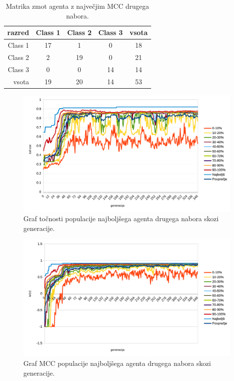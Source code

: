 \begin{table}[H]
    \centering
    \begin{tabular}{||rcccc||}
        \hline
        razred  & Class 1 & Class 2 & Class 3 & vsota \\ \hline
        Class 1 & 17      & 1       & 0       & 18    \\ \hline
        Class 2 & 2       & 19      & 0       & 21    \\ \hline
        Class 3 & 0       & 0       & 14      & 14    \\ \hline
        vsota   & 19      & 20      & 14      & 53    \\ \hline
    \end{tabular}
    \caption{Matrika zmot agenta z največjim MCC drugega nabora.}
    \label{tab:wine_mcc_2}
\end{table}

\begin{figure}[H]
    \begin{center}
        \includegraphics[width=13cm]{wine/2/acc}
    \end{center}
    \caption{Graf točnosti populacije najboljšega agenta drugega nabora skozi generacije.}
    \label{fig:wine_acc_2}
\end{figure}

\begin{figure}[H]
    \begin{center}
        \includegraphics[width=13cm]{wine/2/mcc}
    \end{center}
    \caption{Graf MCC populacije najboljšega agenta drugega nabora skozi generacije.}
    \label{fig:wine_mcc_2}
\end{figure}

